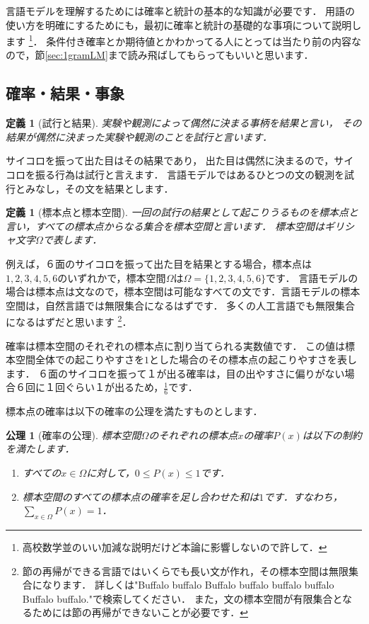 \documentclass[11pt]{report}
\newtheorem{definition}[theorem]{定義}
\newtheorem{axiom}[theorem]{公理}
\begin{document}
言語モデルを理解するためには確率と統計の基本的な知識が必要です．
用語の使い方を明確にするためにも，最初に確率と統計の基礎的な事項について説明します
\footnote{高校数学並のいい加減な説明だけど本論に影響しないので許して．}．
条件付き確率とか期待値とかわかってる人にとっては当たり前の内容なので，節\ref{sec:1gramLM}まで読み飛ばしてもらってもいいと思います．

\subsection{確率・結果・事象}

\begin{definition}[試行と結果]
	実験や観測によって偶然に決まる事柄を結果と言い，
	その結果が偶然に決まった実験や観測のことを試行と言います．
\end{definition}

サイコロを振って出た目はその結果であり，
出た目は偶然に決まるので，サイコロを振る行為は試行と言えます．
言語モデルではあるひとつの文の観測を試行とみなし，その文を結果とします．

\begin{definition}[標本点と標本空間]
	一回の試行の結果として起こりうるものを標本点と言い，すべての標本点からなる集合を標本空間と言います．
	標本空間はギリシャ文字$\Omega$で表します．
\end{definition}

例えば，６面のサイコロを振って出た目を結果とする場合，標本点は$1,2,3,4,5,6$のいずれかで，標本空間$\Omega$は$\Omega = \{1,2,3,4,5,6\}$です．
言語モデルの場合は標本点は文なので，標本空間は可能なすべての文です．言語モデルの標本空間は，自然言語では無限集合になるはずです．
多くの人工言語でも無限集合になるはずだと思います
\footnote{節の再帰ができる言語ではいくらでも長い文が作れ，その標本空間は無限集合になります．
詳しくは"Buffalo buffalo Buffalo buffalo buffalo buffalo Buffalo buffalo."で検索してください．
また，文の標本空間が有限集合となるためには節の再帰ができないことが必要です．}．

確率は標本空間のそれぞれの標本点に割り当てられる実数値です．
この値は標本空間全体での起こりやすさを$1$とした場合のその標本点の起こりやすさを表します．
６面のサイコロを振って１が出る確率は，目の出やすさに偏りがない場合６回に１回ぐらい１が出るため，$\frac{1}{6}$です．

標本点の確率は以下の確率の公理を満たすものとします．

\begin{axiom}[確率の公理]
	標本空間$\Omega$のそれぞれの標本点$x$の確率$P(x)$は以下の制約を満たします．
	\begin{enumerate}
		\item すべての$x \in \Omega$に対して，$0 \leq P(x) \leq 1$です．
		\item 標本空間のすべての標本点の確率を足し合わせた和は$1$です．すなわち，$\displaystyle \sum_{x \in \Omega} P(x) = 1$．
	\end{enumerate}
\end{axiom}
\end{document}
